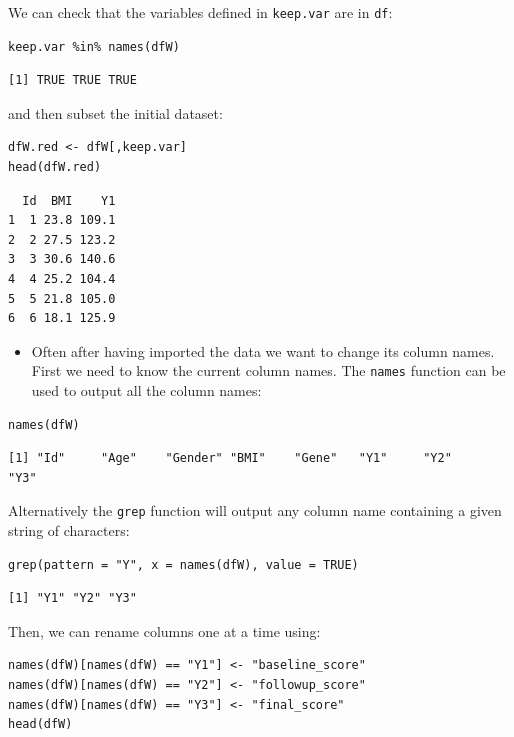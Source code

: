 \documentclass[12pt]{article}
\begin{document}
We can check that the variables defined in \texttt{keep.var} are in \texttt{df}:
\lstset{language=r,label= ,caption= ,captionpos=b,numbers=none}
\begin{lstlisting}
keep.var %in% names(dfW)
\end{lstlisting}

\begin{verbatim}
[1] TRUE TRUE TRUE
\end{verbatim}

and then subset the initial dataset:
\lstset{language=r,label= ,caption= ,captionpos=b,numbers=none}
\begin{lstlisting}
dfW.red <- dfW[,keep.var]
head(dfW.red)
\end{lstlisting}

\begin{verbatim}
  Id  BMI    Y1
1  1 23.8 109.1
2  2 27.5 123.2
3  3 30.6 140.6
4  4 25.2 104.4
5  5 21.8 105.0
6  6 18.1 125.9
\end{verbatim}

\begin{itemize}
\item Often after having imported the data we want to change its column
names. First we need to know the current column names. The \texttt{names}
function can be used to output all the column names:
\end{itemize}
\lstset{language=r,label= ,caption= ,captionpos=b,numbers=none}
\begin{lstlisting}
names(dfW)
\end{lstlisting}

\begin{verbatim}
[1] "Id"     "Age"    "Gender" "BMI"    "Gene"   "Y1"     "Y2"     "Y3"
\end{verbatim}

Alternatively the \texttt{grep} function will output any column name
containing a given string of characters:
\lstset{language=r,label= ,caption= ,captionpos=b,numbers=none}
\begin{lstlisting}
grep(pattern = "Y", x = names(dfW), value = TRUE)
\end{lstlisting}

\begin{verbatim}
[1] "Y1" "Y2" "Y3"
\end{verbatim}

Then, we can rename columns one at a time using:
\lstset{language=r,label= ,caption= ,captionpos=b,numbers=none}
\begin{lstlisting}
names(dfW)[names(dfW) == "Y1"] <- "baseline_score"
names(dfW)[names(dfW) == "Y2"] <- "followup_score"
names(dfW)[names(dfW) == "Y3"] <- "final_score"
head(dfW)
\end{lstlisting}
\end{document}
